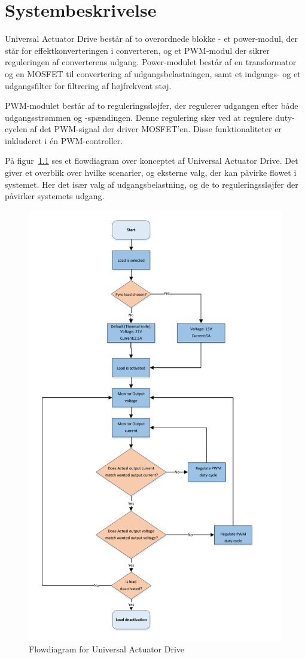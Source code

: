 
\chapter{Systembeskrivelse}
Universal Actuator Drive består af to overordnede blokke - et power-modul, der står for effektkonverteringen i converteren, og et PWM-modul der sikrer reguleringen af converterens udgang. Power-modulet består af en transformator og en MOSFET til convertering af udgangsbelastningen, samt et indgangs- og et udgangsfilter for filtrering af højfrekvent støj.

PWM-modulet består af to reguleringssløjfer, der regulerer udgangen efter både udgangsstrømmen og -spændingen. Denne regulering sker ved at regulere duty-cyclen af det PWM-signal der driver MOSFET'en. Disse funktionaliteter er inkluderet i én PWM-controller. 

På figur~\ref{fig:flowdiagram} ses et flowdiagram over konceptet af Universal Actuator Drive. Det giver et overblik over hvilke scenarier, og eksterne valg, der kan påvirke flowet i systemet. Her det især valg af udgangsbelastning, og de to reguleringssløjfer der påvirker systemets udgang.

\begin{figure}[H]
	\centering
	\includegraphics[width=0.7\linewidth]{../Dokumentation/tex/kravspecifikation/billeder/Flow_diagram.pdf}
	\caption{Flowdiagram for Universal Actuator Drive}
	\label{fig:flowdiagram}
\end{figure}